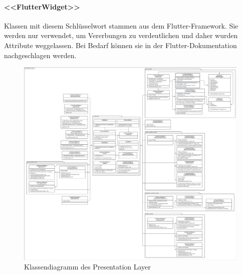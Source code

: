 \documentclass{entwurfsheft}
\begin{document}
\paragraph{<<FlutterWidget>>} Klassen mit diesem Schlüsselwort stammen aus dem Flutter-Framework. Sie werden nur verwendet, um Vererbungen zu verdeutlichen und daher wurden Attribute weggelassen. Bei Bedarf können sie in der Flutter-Dokumentation nachgeschlagen werden.
\begin{figure}[htp]
    \centering
    \includegraphics[width = \textwidth]{images/presentationLayer/classDiagrams/presentationLayer.pdf}
    \caption{Klassendiagramm des Presentation Layer}
    \label{fig:presentation-layer}
\end{figure}
\newpage
\end{document}
